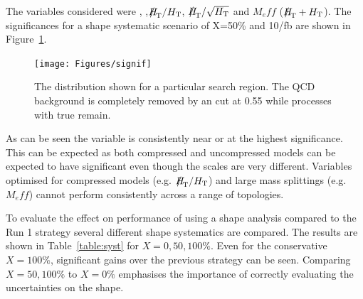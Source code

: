 The variables considered were \alphat, \mht,$\mht/\scalht$, $\mht/\sqrt{\scalht}$ and 
$M_eff$ ($\mht+\scalht$). The significances for a shape systematic 
scenario of X=50\% and 10/fb are shown in Figure~\ref{fig:signif}. 

\begin{figure}
\centering
    \texttt{[image: Figures/signif]}
  \caption{The \alphat distribution shown for a particular search region. The QCD background is completely removed by an \alphat cut at 0.55 while processes with true \met remain.}
  \label{fig:signif}
\end{figure}

As can be seen the \mht variable is consistently near or at the highest 
significance. This can be expected as both compressed and uncompressed models can be expected 
to have significant \mht even though the \scalht scales are very different. Variables optimised
for compressed models (e.g. $\mht/\scalht$) and large mass splittings (e.g. $M_eff$) cannot perform consistently across a range of topologies.

To evaluate the effect on performance of using a shape analysis compared to the
Run 1 strategy several different shape systematics are compared. The results 
are shown in Table~\ref{table:syst} for $X = 0,50,100\%$. Even for the conservative
$X=100\%$, significant gains over the previous strategy can be seen. Comparing
$X=50,100\%$ to $X=0\%$ emphasises the importance of correctly evaluating the uncertainties on the shape.

